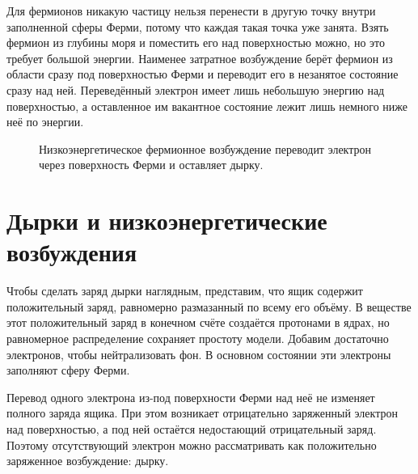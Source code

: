 Для фермионов никакую частицу нельзя перенести в другую точку внутри заполненной сферы Ферми, потому что каждая такая точка уже занята. Взять фермион из глубины моря и поместить его над поверхностью можно, но это требует большой энергии. Наименее затратное возбуждение берёт фермион из области сразу под поверхностью Ферми и переводит его в незанятое состояние сразу над ней. Переведённый электрон имеет лишь небольшую энергию над поверхностью, а оставленное им вакантное состояние лежит лишь немного ниже неё по энергии.

\begin{figure}
\centering
{}
\caption{Низкоэнергетическое фермионное возбуждение переводит электрон через поверхность Ферми и оставляет дырку.}
\end{figure}

\section{Дырки и низкоэнергетические возбуждения}

Чтобы сделать заряд дырки наглядным, представим, что ящик содержит положительный заряд, равномерно размазанный по всему его объёму. В веществе этот положительный заряд в конечном счёте создаётся протонами в ядрах, но равномерное распределение сохраняет простоту модели. Добавим достаточно электронов, чтобы нейтрализовать фон. В основном состоянии эти электроны заполняют сферу Ферми.

Перевод одного электрона из-под поверхности Ферми над неё не изменяет полного заряда ящика. При этом возникает отрицательно заряженный электрон над поверхностью, а под ней остаётся недостающий отрицательный заряд. Поэтому отсутствующий электрон можно рассматривать как положительно заряженное возбуждение: дырку.

\begin{classroomqa}
\end{classroomqa}

